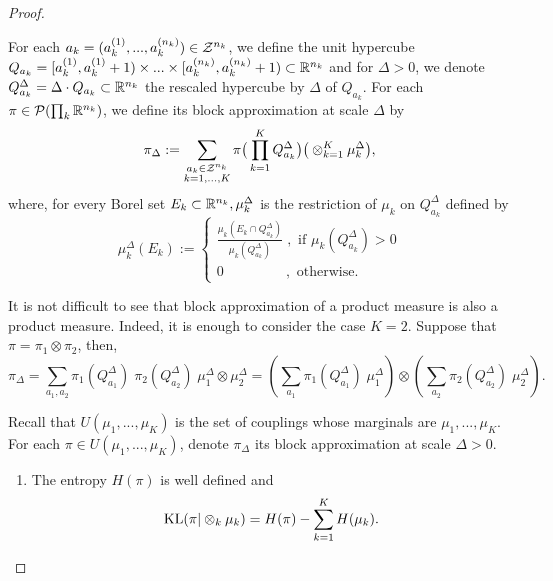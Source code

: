 \begin{proof}
\begin{definition}
      For each $a_k = (a_k^{(1)}, ...,a_k^{(n_k)}) \in \mathcal Z^{n_k}$, we define the unit hypercube
      $Q_{a_k} = [a_k^{(1)}, a_k^{(1)} + 1) \times ... \times [a_k^{(n_k)}, a_k^{(n_k)} + 1) \subset \mathbb R^{n_k}$ and for $\Delta > 0$,
      we denote $Q^{\Delta}_{a_k} = \Delta \cdot Q_{a_k} \subset \mathbb R^{n_k}$ the rescaled hypercube by $\Delta$ of $Q_{a_k}$.
      For each $\pi \in \mathcal P(\prod_k \mathbb R^{n_k})$, we define its block approximation at scale $\Delta$ by
      \begin{equation}
        \pi_{\Delta} := \sum_{\substack{a_k \in \mathcal Z^{n_k} \\ k = 1, ..., K}}
        \pi \big(\prod_{k=1}^K Q^{\Delta}_{a_k}\big) \big( \otimes_{k=1}^K \mu_k^{\Delta} \big),
      \end{equation}
      where, for every Borel set $E_k \subset \mathbb R^{n_k}, \mu_k^{\Delta}$ is the restriction of $\mu_k$ on $Q^{\Delta}_{a_k}$ defined by
      \begin{equation}
        \mu_k^{\Delta}(E_k):=
        \begin{cases}
          \frac{\mu_k(E_k \cap Q^{\Delta}_{a_k})}{\mu_k(Q^{\Delta}_{a_k})} \; ,\text{ if } \mu_k(Q^{\Delta}_{a_k}) > 0 \\
          0 \;\;\;\;\;\;\;\;\;\;\;\;\;\;\;\;,\text{ otherwise}.
        \end{cases}
      \end{equation}
    \end{definition}
    It is not difficult to see that block approximation of a product measure is also a product measure. Indeed, it is enough to consider the case
    $K=2$. Suppose that $\pi = \pi_1 \otimes \pi_2$, then,
    \begin{equation}
      \pi_{\Delta} = \sum_{a_1, a_2}
      \pi_1(Q^{\Delta}_{a_1}) \; \pi_2(Q^{\Delta}_{a_2}) \; \mu_1^{\Delta} \otimes \mu_2^{\Delta} =
      \left( \sum_{a_1} \pi_1(Q^{\Delta}_{a_1}) \; \mu_1^{\Delta} \right) \otimes
      \left( \sum_{a_2} \pi_2(Q^{\Delta}_{a_2}) \; \mu_2^{\Delta} \right).
    \end{equation}
    \begin{lemma}
        \label{lemma:block_approx}
      Recall that $U(\mu_1, ..., \mu_K)$ is the set of couplings whose marginals are $\mu_1,...,\mu_K$.
      For each $\pi \in U(\mu_1, ..., \mu_K)$, denote $\pi_{\Delta}$ its block approximation at scale $\Delta > 0$.
      \begin{enumerate}
        \item The entropy $H(\pi)$ is well defined and
        \begin{equation}
          \text{KL}(\pi \vert \otimes_k \mu_k) = H(\pi) - \sum_{k=1}^K H(\mu_k).
        \end{equation}


\end{enumerate}
\end{lemma}
\end{proof}
